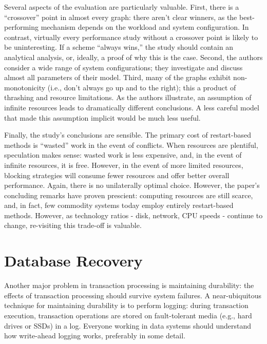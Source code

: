 \documentclass[b5paper,11pt,twoside,openright]{book}
\newcommand\Section[2]{
  \hypertarget{#1}{
    \section{#2}
  }
}
\begin{document}
Several aspects of the evaluation are particularly valuable. First,
there is a ``crossover'' point in almost every graph: there aren't clear
winners, as the best-performing mechanism depends on the workload and
system configuration. In contrast, virtually every performance study
without a crossover point is likely to be uninteresting. If a scheme
``always wins,'' the study should contain an analytical analysis, or,
ideally, a proof of why this is the case. Second, the authors consider a
wide range of system configurations; they investigate and discuss almost
all parameters of their model. Third, many of the graphs exhibit
non-monotonicity (i.e., don't always go up and to the right); this a
product of thrashing and resource limitations. As the authors
illustrate, an assumption of infinite resources leads to dramatically
different conclusions. A less careful model that made this assumption
implicit would be much less useful.

Finally, the study's conclusions are sensible. The primary cost of
restart-based methods is ``wasted'' work in the event of conflicts. When
resources are plentiful, speculation makes sense: wasted work is less
expensive, and, in the event of infinite resources, it is free. However,
in the event of more limited resources, blocking strategies will consume
fewer resources and offer better overall performance. Again, there is no
unilaterally optimal choice. However, the paper's concluding remarks
have proven prescient: computing resources are still scarce, and, in
fact, few commodity systems today employ entirely restart-based methods.
However, as technology ratios - disk, network, CPU speeds - continue to
change, re-visiting this trade-off is valuable.

\Section{database-recovery}{%
Database Recovery
}

Another major problem in transaction processing is maintaining
durability: the effects of transaction processing should survive system
failures. A near-ubiquitous technique for maintaining durability is to
perform logging: during transaction execution, transaction operations
are stored on fault-tolerant media (e.g., hard drives or SSDs) in a log.
Everyone working in data systems should understand how write-ahead
logging works, preferably in some detail.
\end{document}
